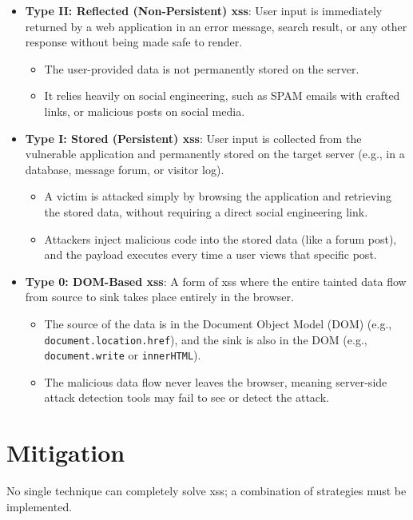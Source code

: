 \begin{itemize}
    \item \textbf{Type II: Reflected (Non-Persistent) \gls{xss}}: User input is immediately returned by a web application in an error message, search result, or any other response without being made safe to render. 
    \begin{itemize}
        \item The user-provided data is not permanently stored on the server.
        \item It relies heavily on social engineering, such as SPAM emails with crafted links, or malicious posts on social media.
    \end{itemize}
    
    \item \textbf{Type I: Stored (Persistent) \gls{xss}}: User input is collected from the vulnerable application and permanently stored on the target server (e.g., in a database, message forum, or visitor log).
    \begin{itemize}
        \item A victim is attacked simply by browsing the application and retrieving the stored data, without requiring a direct social engineering link.
        \item Attackers inject malicious code into the stored data (like a forum post), and the payload executes every time a user views that specific post.
    \end{itemize}
    
    \item \textbf{Type 0: DOM-Based \gls{xss}}: A form of \gls{xss} where the entire tainted data flow from source to sink takes place entirely in the browser.
    \begin{itemize}
        \item The source of the data is in the Document Object Model (DOM) (e.g., \texttt{document.location.href}), and the sink is also in the DOM (e.g., \texttt{document.write} or \texttt{innerHTML}).
        \item The malicious data flow never leaves the browser, meaning server-side attack detection tools may fail to see or detect the attack.
    \end{itemize}
\end{itemize}

\section{ Mitigation}
No single technique can completely solve \gls{xss}; a combination of strategies must be implemented.

